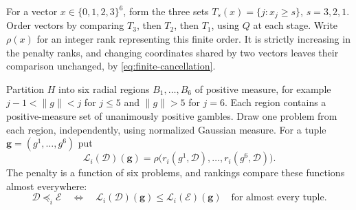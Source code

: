 \documentclass[11pt]{article}
\theoremstyle{remark}\newtheorem{remark}[theorem]{Remark}
\newcommand{\Dscr}{\mathcal D}
\newcommand{\Escr}{\mathcal E}
\begin{document}
For a vector $x\in\{0,1,2,3\}^6$, form the three sets
$T_s(x)=\{j:x_j\ge s\}$, $s=3,2,1$.
Order vectors by comparing $T_3$, then $T_2$, then $T_1$, using $Q$ at each
stage. Write $\rho(x)$ for an integer rank representing this finite order.
It is strictly increasing in the penalty
ranks, and changing coordinates shared by two vectors leaves their
comparison unchanged, by \eqref{eq:finite-cancellation}.

Partition $H$ into six radial regions $B_1,\ldots,B_6$ of positive measure,
for example $j-1<\|g\|<j$ for $j\le5$ and $\|g\|>5$ for $j=6$.
Each region contains a positive-measure set of unanimously positive gambles.
Draw one problem from each region, independently, using normalized Gaussian
measure. For a tuple $\boldsymbol g=(g^1,\ldots,g^6)$ put
\[
 \mathcal L_i(\Dscr)(\boldsymbol g)
 =\rho\bigl(r_i(g^1,\Dscr),\ldots,r_i(g^6,\Dscr)\bigr).
\]
The penalty is a function of six problems, and rankings compare these
functions almost everywhere:
\begin{equation}
 \Dscr\preceq_i\Escr\quad\Longleftrightarrow\quad
 \mathcal L_i(\Dscr)(\boldsymbol g)
 \le\mathcal L_i(\Escr)(\boldsymbol g)
 \quad\text{for almost every tuple}.
 \label{eq:tuple-ranking}
\end{equation}
\end{document}

